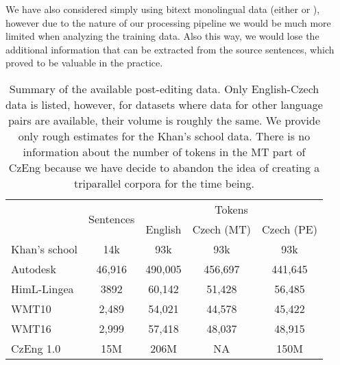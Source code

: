 We have also considered simply using bitext monolingual data (either 
or ), however due to the nature of our processing
pipeline we would be much more limited when analyzing the training data. Also this way, we would
lose the additional information that can be extracted from the source sentences, which proved to be valuable in the practice.

\begin{table*}[t]
\centering
\small

\begin{tabular}{lcccc}
\multirow{2}{*}{}  &  \multirow{2}{*}{\hash{} Sentences}  &  \multicolumn{3}{c}{\hash{} Tokens}  \\
&   & English & Czech (MT) & Czech (PE) \\
\hline
Khan's school & \tilda{}14k & \tilda{}93k & \tilda{}93k & \tilda{}93k \\
Autodesk & 46,916 & 490,005 & 456,697 & 441,645 \\
HimL-Lingea & 3892 & 60,142 & 51,428 & 56,485 \\
WMT10 & 2,489 & 54,021 & 44,578 & 45,422 \\
WMT16 & 2,999 & 57,418 & 48,037 & 48,915 \\
CzEng 1.0 & 15M & 206M & NA & 150M \\
\end{tabular}
\caption{Summary of the available post-editing data. Only English-Czech data is listed, however, for datasets
where data for other language pairs are available, their volume is roughly the same. We provide only rough estimates for the Khan's school data.
There is no information about the number of tokens in the MT part of CzEng because we have decide to abandon the
idea of creating a triparallel corpora for the time being.
}
\label{avail-data}
\end{table*}



